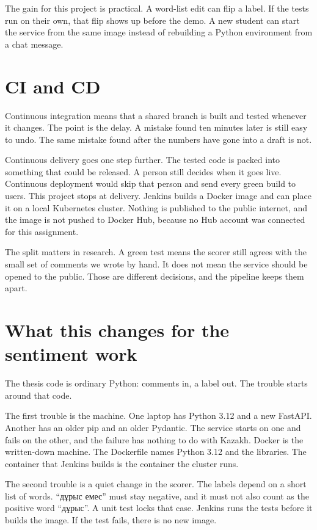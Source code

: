 \documentclass[12pt,a4paper]{article}
\begin{document}
The gain for this project is practical. A word-list edit can flip a label. If the tests run on their own, that flip shows up before the demo. A new student can start the service from the same image instead of rebuilding a Python environment from a chat message.

\section{CI and CD}

Continuous integration means that a shared branch is built and tested whenever it changes. The point is the delay. A mistake found ten minutes later is still easy to undo. The same mistake found after the numbers have gone into a draft is not.

Continuous delivery goes one step further. The tested code is packed into something that could be released. A person still decides when it goes live. Continuous deployment would skip that person and send every green build to users. This project stops at delivery. Jenkins builds a Docker image and can place it on a local Kubernetes cluster. Nothing is published to the public internet, and the image is not pushed to Docker Hub, because no Hub account was connected for this assignment.

The split matters in research. A green test means the scorer still agrees with the small set of comments we wrote by hand. It does not mean the service should be opened to the public. Those are different decisions, and the pipeline keeps them apart.

\section{What this changes for the sentiment work}

The thesis code is ordinary Python: comments in, a label out. The trouble starts around that code.

The first trouble is the machine. One laptop has Python 3.12 and a new FastAPI. Another has an older pip and an older Pydantic. The service starts on one and fails on the other, and the failure has nothing to do with Kazakh. Docker is the written-down machine. The Dockerfile names Python 3.12 and the libraries. The container that Jenkins builds is the container the cluster runs.

The second trouble is a quiet change in the scorer. The labels depend on a short list of words. ``дұрыс емес'' must stay negative, and it must not also count as the positive word ``дұрыс''. A unit test locks that case. Jenkins runs the tests before it builds the image. If the test fails, there is no new image.
\end{document}
